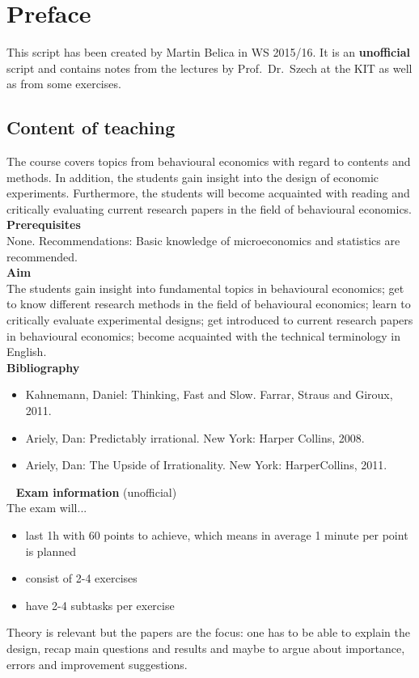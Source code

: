 

\chapter*{Preface}
This script has been created by Martin Belica in WS 2015/16. It is an \textbf{unofficial} script and contains notes from the lectures by Prof.~Dr.~Szech at the KIT as well as from some exercises.
\section*{Content of teaching}
The course covers topics from behavioural economics with regard to contents and methods. In addition, the students gain insight into the design of economic experiments. Furthermore, the students will become acquainted with reading and critically evaluating current research papers in the field of behavioural economics. \\

\textbf{Prerequisites} \\
None. Recommendations: Basic knowledge of microeconomics and statistics are recommended. \\

\textbf{Aim} \\
The students gain insight into fundamental topics in behavioural economics;
get to know different research methods in the field of behavioural economics;
learn to critically evaluate experimental designs;
get introduced to current research papers in behavioural economics;
become acquainted with the technical terminology in English. \\

\textbf{Bibliography}
\begin{itemize}
	\item Kahnemann, Daniel: Thinking, Fast and Slow. Farrar, Straus and Giroux, 2011.
	\item Ariely, Dan: Predictably irrational. New York: Harper Collins, 2008.
	\item Ariely, Dan: The Upside of Irrationality. New York: HarperCollins, 2011. 
\end{itemize}
~\newline
\textbf{Exam information} (unofficial) \\
The exam will...
\begin{itemize}
	\item last 1h with 60 points to achieve, which means in average 1 minute per point is planned
	\item consist of 2-4 exercises
	\item have 2-4 subtasks per exercise 
\end{itemize}
Theory is relevant but the papers are the focus: one has to be able to explain the design, recap main questions and results and maybe to argue about importance, errors and improvement suggestions.
